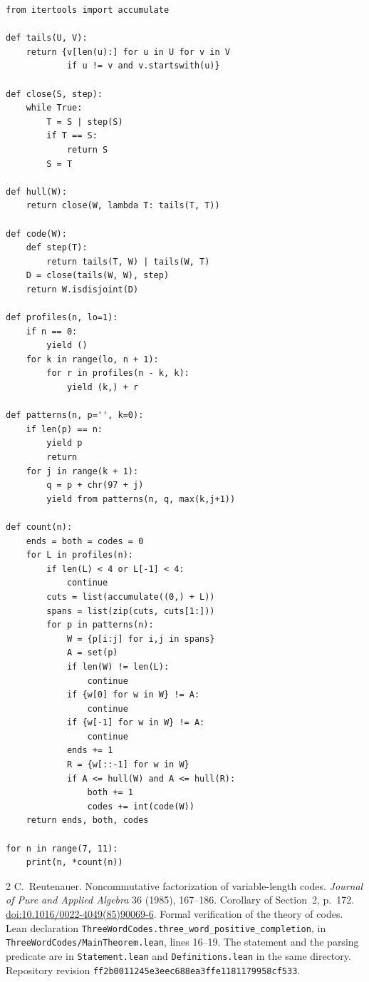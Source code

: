 \documentclass[11pt,a4paper]{article}
\begin{document}
\begin{Verbatim}[fontsize=\small]
from itertools import accumulate

def tails(U, V):
    return {v[len(u):] for u in U for v in V
            if u != v and v.startswith(u)}

def close(S, step):
    while True:
        T = S | step(S)
        if T == S:
            return S
        S = T

def hull(W):
    return close(W, lambda T: tails(T, T))

def code(W):
    def step(T):
        return tails(T, W) | tails(W, T)
    D = close(tails(W, W), step)
    return W.isdisjoint(D)

def profiles(n, lo=1):
    if n == 0:
        yield ()
    for k in range(lo, n + 1):
        for r in profiles(n - k, k):
            yield (k,) + r

def patterns(n, p='', k=0):
    if len(p) == n:
        yield p
        return
    for j in range(k + 1):
        q = p + chr(97 + j)
        yield from patterns(n, q, max(k,j+1))

def count(n):
    ends = both = codes = 0
    for L in profiles(n):
        if len(L) < 4 or L[-1] < 4:
            continue
        cuts = list(accumulate((0,) + L))
        spans = list(zip(cuts, cuts[1:]))
        for p in patterns(n):
            W = {p[i:j] for i,j in spans}
            A = set(p)
            if len(W) != len(L):
                continue
            if {w[0] for w in W} != A:
                continue
            if {w[-1] for w in W} != A:
                continue
            ends += 1
            R = {w[::-1] for w in W}
            if A <= hull(W) and A <= hull(R):
                both += 1
                codes += int(code(W))
    return ends, both, codes

for n in range(7, 11):
    print(n, *count(n))
\end{Verbatim}

\begin{thebibliography}{2}
 C.~Reutenauer. Noncommutative factorization of variable-length codes.
  \emph{Journal of Pure and Applied Algebra} 36 (1985), 167--186. Corollary of Section~2,
  p.~172. \href{https://doi.org/10.1016/0022-4049(85)90069-6}{doi:10.1016/0022-4049(85)90069-6}.
 Formal verification of the theory of codes. Lean declaration
  \texttt{ThreeWordCodes.three\_word\_positive\_completion}, in
  \texttt{ThreeWordCodes/MainTheorem.lean}, lines 16--19. The statement and the parsing predicate
  are in \texttt{Statement.lean} and \texttt{Definitions.lean} in the same directory. Repository
  revision \texttt{ff2b0011245e3eec688ea3ffe1181179958cf533}.
\end{thebibliography}
\end{document}
